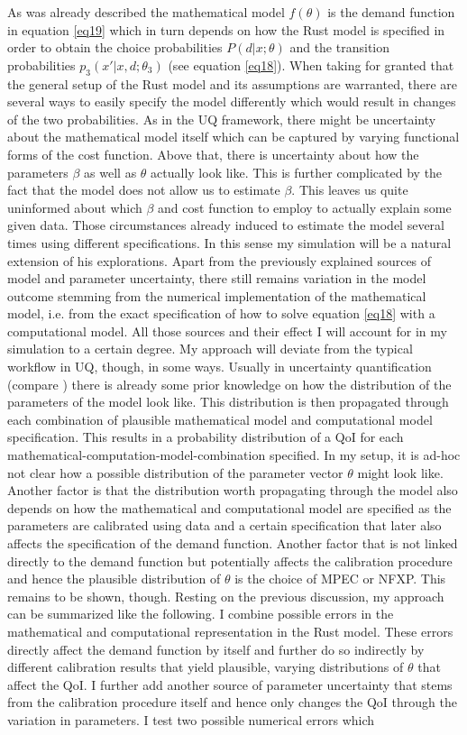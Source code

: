 As was already described the mathematical model $f(\theta)$ is the demand function in equation \ref{eq19} which in turn depends on how the Rust model is specified in order to obtain the choice probabilities $P(d|x; \theta)$ and the transition probabilities $p_3(x'|x, d; \theta_3)$ (see equation \ref{eq18}). When taking for granted that the general setup of the Rust model and its assumptions are warranted, there are several ways to easily specify the model differently which would result in changes of the two probabilities. As in the UQ framework, there might be uncertainty about the mathematical model itself which can be captured by varying functional forms of the cost function. Above that, there is uncertainty about how the parameters $\beta$ as well as $\theta$ actually look like. This is further complicated by the fact that the model does not allow us to estimate $\beta$. This leaves us quite uninformed about which $\beta$ and cost function to employ to actually explain some given data. Those circumstances already induced \cite{Rust.1987} to estimate the model several times using different specifications. In this sense my simulation will be a natural extension of his explorations. Apart from the previously explained sources of model and parameter uncertainty, there still remains variation in the model outcome stemming from the numerical implementation of the mathematical model, i.e. from the exact specification of how to solve equation \ref{eq18} with a computational model. All those sources and their effect I will account for in my simulation to a certain degree. My approach will deviate from the typical workflow in UQ, though, in some ways. Usually in uncertainty quantification (compare \cite{Smith.2013, Oberkampf.2010}) there is already some prior knowledge on how the distribution of the parameters of the model look like. This distribution is then propagated through each combination of plausible mathematical model and computational model specification. This results in a probability distribution of a QoI for each mathematical-computation-model-combination specified. In my setup, it is ad-hoc not clear how a possible distribution of the parameter vector $\theta$ might look like. Another factor is that the distribution worth propagating through the model also depends on how the mathematical and computational model are specified as the parameters are calibrated using data and a certain specification that later also affects the specification of the demand function. Another factor that is not linked directly to the demand function but potentially affects the calibration procedure and hence the plausible distribution of $\theta$ is the choice of MPEC or NFXP. This remains to be shown, though. Resting on the previous discussion, my approach can be summarized like the following. I combine possible errors in the mathematical and computational representation in the Rust model. These errors directly affect the demand function by itself and further do so indirectly by different calibration results that yield plausible, varying distributions of $\theta$ that affect the QoI. I further add another source of parameter uncertainty that stems from the calibration procedure itself and hence only changes the QoI through the variation in parameters. I test two possible numerical errors which 
